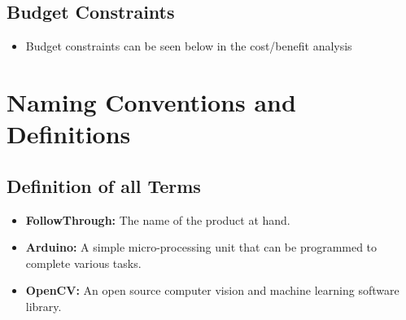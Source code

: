 \subsection{Budget Constraints}
\begin{itemize}
    \item Budget constraints can be seen below in the cost/benefit analysis
\end{itemize}

\section{Naming Conventions and Definitions}
\subsection{Definition of all Terms}
\begin{itemize}
    \item \textbf{FollowThrough:} The name of the product at hand.
    \item \textbf{Arduino:} A simple micro-processing unit that can be programmed to complete various tasks.
    \item \textbf{OpenCV:} An open source computer vision and machine learning software library.
\end{itemize}


